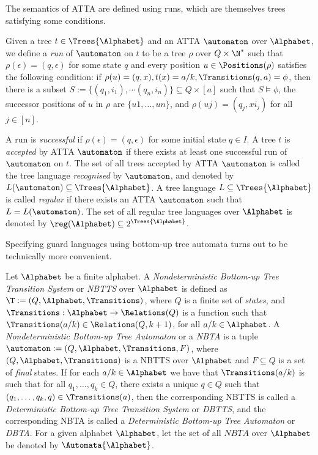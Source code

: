 The semantics of ATTA are defined using runs, which are themselves trees satisfying some conditions.
\begin{definition}\label{def:acceptanceByAtta}
  Given a tree $t \in \Trees{\Alphabet}$ and an ATTA $\automaton$ over $\Alphabet$, we define a \emph{run} of $\automaton$ on $t$ to be a tree $\rho$ over $Q \times \N^*$ 
 such that $\rho(\epsilon) = (q, \epsilon)$ for some state $q$ and every position $u \in \Positions(\rho)$ satisfies the following condition: if $\rho(u) = (q, x), t(x) = a/k, \Transitions(q ,a) = \phi$, then there is a subset $S := \{(q_1, i_1), \dotsm (q_n, i_n)\} \subseteq Q \times [a]$ such that $S \models \phi$, the successor positions of $u$ in $\rho$ are $\{u1, \dots, un\}$, and $\rho(uj) = (q_j, xi_j)$ for all $j \in [n]$.
  
  A run is \emph{successful} if $\rho(\epsilon) = (q, \epsilon)$ for some initial state $q \in I$. A tree $t$ is \emph{accepted} by ATTA $\automaton$ if there exists at least one successful run of $\automaton$ on $t$. The set of all trees accepted by ATTA $\automaton$ is called the tree language \emph{recognised} by $\automaton$, and denoted by $L(\automaton) \subseteq \Trees{\Alphabet}$. A tree language $L \subseteq \Trees{\Alphabet}$ is called \emph{regular} if there exists an ATTA $\automaton$ such that $L = L(\automaton)$. The set of all regular tree languages over $\Alphabet$ is denoted by $\reg(\Alphabet) \subseteq 2^{\Trees{\Alphabet}}$.
\end{definition}

Specifying guard languages using bottom-up tree automata turns out to be technically more convenient.
\begin{definition}\label{def:nbtts}
  Let $\Alphabet$ be a finite alphabet. A \emph{Nondeterministic Bottom-up Tree Transition System} or \emph{NBTTS} over $\Alphabet$ is defined as $\T := (Q, \Alphabet, \Transitions)$, where $Q$ is a finite set of \emph{states}, and $\Transitions : \Alphabet \to \Relations(Q)$ is a function such that $\Transitions(a/k) \in \Relations(Q, k+1)$, for all $a/k \in \Alphabet$. A \emph{Nondeterministic Bottom-up Tree Automaton} or a \emph{NBTA} is a tuple $\automaton := (Q, \Alphabet, \Transitions, F)$, where $(Q, \Alphabet, \Transitions)$ is a NBTTS over $\Alphabet$ and $F \subseteq Q$ is a set of \emph{final} states. If for each $a/k \in \Alphabet$ we have that $\Transitions(a/k)$ is such that for all $q_1, \dots, q_k \in Q$, there exists a unique $q \in Q$ such that $(q_1, \dots, q_k, q) \in \Transitions(a)$, then the corresponding NBTTS is called a \emph{Deterministic Bottom-up Tree Transition System} or \emph{DBTTS}, and the corresponding NBTA is called a \emph{Deterministic Bottom-up Tree Automaton} or \emph{DBTA}. For a given alphabet $\Alphabet$, let the set of all $NBTA$ over $\Alphabet$ be denoted by  $\Automata{\Alphabet}$.
\end{definition}

